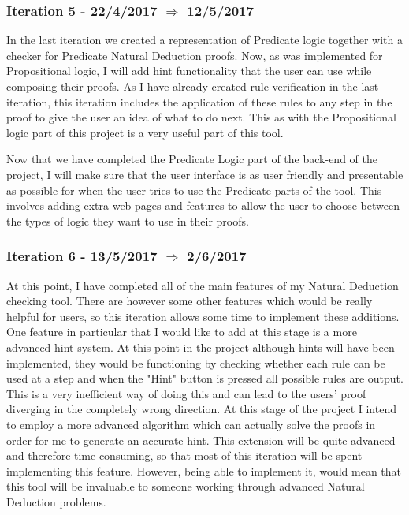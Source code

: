 \subsubsection{Iteration 5 - 22/4/2017 $\Rightarrow$ 12/5/2017}

In the last iteration we created a representation of Predicate logic together with a checker for Predicate Natural Deduction proofs. Now, as was implemented for Propositional logic, I will add hint functionality that the user can use while composing their proofs. As I have already created rule verification in the last iteration, this iteration includes the application of these rules to any step in the proof to give the user an idea of what to do next. This as with the Propositional logic part of this project is a very useful part of this tool. 

Now that we have completed the Predicate Logic part of the back-end of the project, I will make sure that the user interface is as user friendly and presentable as possible for when the user tries to use the Predicate parts of the tool. This involves adding extra web pages and features to allow the user to choose between the types of logic they want to use in their proofs.

\subsubsection{Iteration 6 - 13/5/2017 $\Rightarrow$ 2/6/2017}

At this point, I have completed all of the main features of my Natural Deduction checking tool. There are however some other features which would be really helpful for users, so this iteration allows some time to implement these additions. One feature in particular that I would like to add at this stage is a more advanced hint system. At this point in the project although hints will have been implemented, they would be functioning by checking whether each rule can be used at a step and when the "Hint" button is pressed all possible rules are output. This is a very inefficient way of doing this and can lead to the users' proof diverging in the completely wrong direction. At this stage of the project I intend to employ a more advanced algorithm which can actually solve the proofs in order for me to generate an accurate hint. This extension will be quite advanced and therefore time consuming, so that most of this iteration will be spent implementing this feature. However, being able to implement it, would mean that this tool will be invaluable to someone working through advanced Natural Deduction problems.

